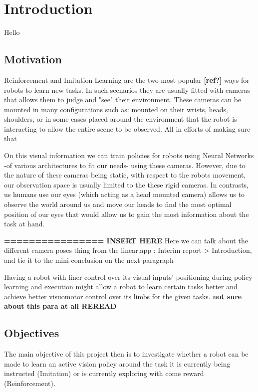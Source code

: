 \chapter{Introduction}
Hello \cite{greenwade93}
\section{Motivation}
    
    Reinforcement and Imitation Learning are the two most popular \textbf{[ref?]} ways for robots to learn new tasks. In such scenarios they are usually fitted with cameras that allows them to judge and "see" their environment. These cameras can be mounted in many configurations such as: mounted on their wrists, heads, shoulders, or in some cases placed around the environment that the robot is interacting to allow the entire scene to be observed. All in efforts of making sure that 


    On this visual information we can train policies for robots using Neural Networks -of various architectures to fit our needs- using these cameras. However, due to the nature of these cameras being static, with respect to the robots movement, our observation space is usually limited to the these rigid cameras. In contrasts, us humans use our eyes (which acting as a head mounted camera) allows us to observe the world around us and move our heads to find the most optimal position of our eyes that would allow us to gain the most information about the task at hand. 

    \textbf{================ INSERT HERE} Here we can talk about the different camera poses thing from the linear.app : Interim report > Introduction, and tie it to the mini-conclusion on the next paragraph

    Having a robot with finer control over its visual inputs' positioning during policy learning and execution might allow a robot to learn certain tasks better and achieve better visuomotor control over its limbs for the given tasks. \textbf{not sure about this para at all REREAD} 

        
\section{Objectives}
    The main objective of this project then is to investigate whether a robot can be made to learn an active vision policy around the task it is currently being instructed (Imitation) or is currently exploring with come reward (Reinforcement).


